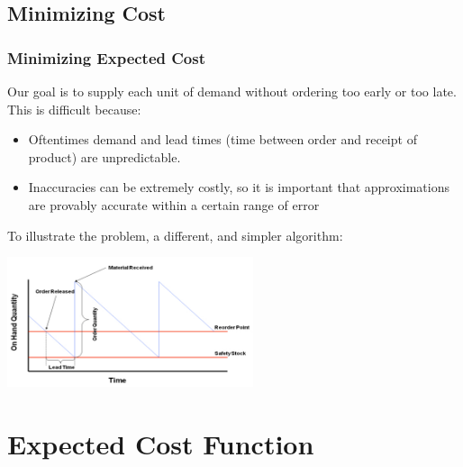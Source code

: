 \documentclass{beamer}
\begin{document}
  \subsection{Minimizing Cost}
  \begin{frame}
    \frametitle{Minimizing Expected Cost}
    Our goal is to supply each unit of demand without ordering too early or too late. This is difficult because:
    \begin{itemize}
      \item Oftentimes demand and lead times (time between order and receipt of product) are unpredictable.
      \item Inaccuracies can be extremely costly, so it is important that approximations are provably accurate within a certain range of error
    \end{itemize}
    To illustrate the problem, a different, and simpler algorithm:
      \begin{center}
      \includegraphics[height=1.5in]{purchasing.png}
      \end{center}
  \end{frame}

  \section{Expected Cost Function}
\end{document}
